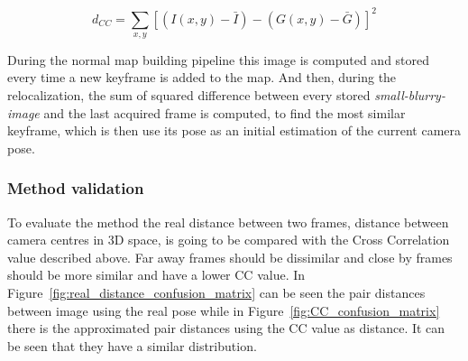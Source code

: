 \begin{equation}
  d_{CC} = \sum_{x,y} [(I(x,y) - \bar{I}) - (G(x,y) - \bar{G})]^2
  \label{eq:CC}
\end{equation}

During the normal map building pipeline this image is computed and stored every time a new keyframe is added to the map. And then, during the relocalization, the sum of squared difference between every stored \textit{small-blurry-image} and the last acquired frame is computed,  to find the most similar keyframe, which is then use its pose as an initial estimation of the current camera pose.\\

\subsubsection{Method validation}
\label{ssub:cc_method_validation}

To evaluate the method the real distance between two frames, distance between camera centres in 3D space, is going to be compared with the Cross Correlation value described above. Far away frames should be dissimilar and close by frames should be more similar and have a lower CC value. In Figure~\ref{fig:real_distance_confusion_matrix} can be seen the pair distances between image using the real pose while in Figure~\ref{fig:CC_confusion_matrix} there is the approximated pair distances using the CC value as distance. It can be seen that they have a similar distribution.\\

